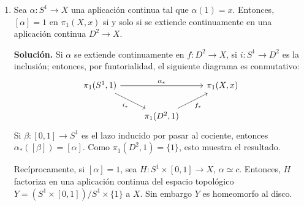 \documentclass[11pt,a4paper]{article}
\theoremstyle{plain}
\theoremstyle{definition}
\theoremstyle{remark}
\newcommand{\RR}{\mathbb R}
\newcommand{\ZZ}{\mathbb Z}
\begin{document}
\begin{enumerate}[label=\arabic*.,leftmargin=*]
\begin{enumerate}[label=\alph*)]
Mostremos ahora que $d:\pi_1(S^1,1)\to\ZZ$ es un morfismo de grupos.
Consideremos los lazos $\alpha_1,\alpha_2\in\Omega(S^1,1)$. Sea
$\tilde\alpha_1:I\to\RR$ el levantamiento de $\alpha_1$ tal que
$\tilde\alpha_1(0)=0$, y sea $\tilde\alpha_2:I\to\RR$ el levantamiento de
$\alpha_2$ tal que $\tilde\alpha_2(0)=\tilde\alpha_1(1)$. El grado
$d(\alpha_1\alpha_2)$ es igual a $\tilde\alpha_2(1)$. Por otra parte,
$d(\alpha_1)=\tilde\alpha_1(1)$ y
$d(\alpha_2)=\tilde\alpha_2(1)-\tilde\alpha_2(0)=\tilde\alpha_2(1)-\tilde\alpha_1(1)$.
Por lo tanto, $d(\alpha_1\alpha_2)=d(\alpha_1)+d(\alpha_2)$.
\item La bola $D^2$ es simplemente conexo. Si existiera $r:S^1\to D^2$,
entonces $r_*:\ZZ\to\{1\}$ sobreyectiva, lo cual no puede suceder.
\item Supongamos que $f:D^2\to D^2$ es una aplicación continua que no
admite ningún punto fijo. Entonces, para todo punto $x\in D^2$, existe un
número real $\lambda=\lambda_x\ge0$ tal que $\|x+\lambda(x-f(x))\|=1$: el
vector $x+\lambda(x-f(x))$ corresponde al punto de intersección del círculo
$S^1$ y el semirrayo que tiene al punto $f(x)$ por extremidad y pasa por
$x$. La aplicación que a todo punto $x\in D^2$ asocia $x+\lambda(x-f(x))$ es
continua. Además, la restricción de esta aplicación sobre $S^1$ es la
identidad $\mathrm{id}_{S^1}:S^1\to S^1$. Por lo tanto, esta aplicación es
un retracto de $D^2$ sobre $S^1$. Contradicción.
\end{enumerate}

\item Sea $\alpha:S^1\to X$ una aplicación continua tal que $\alpha(1)=x$.
Entonces, $[\alpha]=1$ en $\pi_1(X,x)$ si y solo si se extiende continuamente
en una aplicación continua $D^2\to X$.

\noindent\textbf{Solución.} Si $\alpha$ se extiende continuamente en
$f:D^2\to X$, si $i:S^1\to D^2$ es la inclusión; entonces, por
funtorialidad, el siguiente diagrama es conmutativo:
\[
\begin{tikzcd}
\pi_1(S^1,1) \arrow[rr,"\alpha_*"] \arrow[dr,swap,"i_*"] & & \pi_1(X,x) \\
& \pi_1(D^2,1) \arrow[ur,swap,"f_*"] &
\end{tikzcd}
\]
Si $\beta:[0,1]\to S^1$ es el lazo inducido por pasar al cociente, entonces
$\alpha_*([\beta])=[\alpha]$. Como $\pi_1(D^2,1)=\{1\}$, esto muestra el
resultado.

Recíprocamente, si $[\alpha]=1$, sea $H:S^1\times[0,1]\to X$, $\alpha\simeq c$.
Entonces, $H$ factoriza en una aplicación continua del espacio topológico
$Y=(S^1\times[0,1])/S^1\times\{1\}$ a $X$. Sin embargo $Y$ es homeomorfo al
disco.


\end{enumerate}
\end{document}
